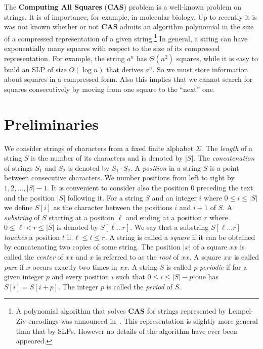 \documentclass[10pt]{article}
\begin{document}
The \textbf{Computing All Squares} (\textbf{CAS}) problem is a well-known problem on strings. It is of importance, for
example, in molecular biology. Up to recently it is was not known whether or not \textbf{CAS} admits an algorithm polynomial 
in the size of a compressed representation of a given string.\footnote{A polynomial algorithm that solves \textbf{CAS} 
for strings represented by Lempel-Ziv encodings was announced in~\cite{8}. This representation is slightly more general 
than that by SLPs. However no details of the algorithm have ever been appeared.} In general, a string can have 
exponentially many squares with respect to the size of its compressed representation. For example, the string $a^n$ 
has $\Theta(n^2)$ squares, while it is easy to build an SLP of size $O(\log n)$ that derives $a^n$. So we must 
store information about squares in a compressed form. Also this implies that we cannot search for squares 
consecutively by moving from one square to the ``next'' one.

\section{Preliminaries}

We consider strings of characters from a fixed finite alphabet $\Sigma$. The \emph{length} of a string $S$ is the number
of its characters and is denoted by $|S|$. The \emph{concatenation} of strings $S_1$ and $S_2$ is denoted by $S_1 \cdot
S_2$.  A \emph{position} in a string $S$ is a point between consecutive characters. We number positions from left to 
right by $1,2,\dots,|S|-1$. It is convenient to consider also the position 0 preceding the text and the position $|S|$ 
following it. For a string $S$ and an integer $i$ where $0 \leq i \leq |S|$ we define $S[i]$ as the character between the positions
$i$ and $i+1$ of $S$. A \emph{substring} of $S$ starting at a position $\ell$  and ending at a position $r$ where $0\leq \ell < r \leq |S|$ 
is denoted by $S[\ell \dots r]$. We say that a substring $S[\ell \dots r]$ \emph{touches} a position $t$ if $\ell \leq t \leq r$. 
A string is called a \emph{square} if it can be obtained
by concatenating two copies of some string. The position $|x|$ of a square $xx$ is called the \emph{center} of $xx$ and
$x$ is referred to as the \emph{root} of $xx$. A square $xx$ is called \emph{pure} if $x$ occurs exactly two times in
$xx$. A string $S$ is called \emph{p-periodic} if for a given integer $p$ and every position $i$ such that $0 \leq i
\leq |S| - p$ one has $S[i] = S[i + p]$. The integer $p$ is called the \emph{period} of $S$.
\end{document}
